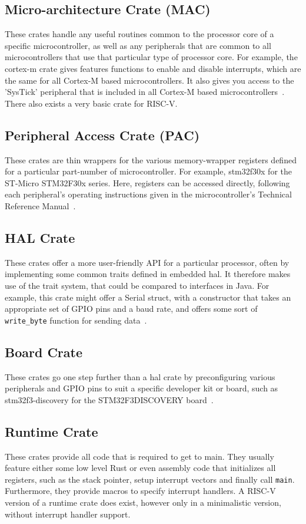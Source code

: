 \subsection{Micro-architecture Crate (MAC)}
These crates handle any useful routines common to the processor core of a specific microcontroller, as well as any peripherals that are common to all microcontrollers that use that particular type of processor core. For example, the cortex-m crate gives features functions to enable and disable interrupts, which are the same for all Cortex-M based microcontrollers. It also gives you access to the 'SysTick' peripheral that is included in all Cortex-M based microcontrollers~\cite{RustEmbedded}. There also exists a very basic crate for RISC-V.

\subsection{Peripheral Access Crate (PAC)}
These crates are thin wrappers for the various memory-wrapper registers defined for a particular part-number of microcontroller. For example, stm32f30x for the ST-Micro STM32F30x series. Here, registers can be accessed directly, following each peripheral's operating instructions given in the microcontroller's Technical Reference Manual~\cite{RustEmbedded}.

\subsection{HAL Crate}
These crates offer a more user-friendly API for a particular processor, often by implementing some common traits defined in embedded \gls{hal}. It therefore makes use of the trait system, that could be compared to interfaces in Java. For example, this crate might offer a Serial struct, with a constructor that takes an appropriate set of GPIO pins and a baud rate, and offers some sort of \texttt{write_byte} function for sending data~\cite{RustEmbedded}. 

\subsection{Board Crate}
These crates go one step further than a \gls{hal} crate by preconfiguring various peripherals and GPIO pins to suit a specific developer kit or board, such as stm32f3-discovery for the STM32F3DISCOVERY board~\cite{RustEmbedded}.

\subsection{Runtime Crate}
These crates provide all code that is required to get to main. They usually feature either some low level Rust or even assembly code that initializes all registers, such as the stack pointer, setup interrupt vectors and finally call \texttt{main}. Furthermore, they provide macros to specify interrupt handlers. A RISC-V version of a runtime crate does exist, however only in a minimalistic version, without interrupt handler support.

